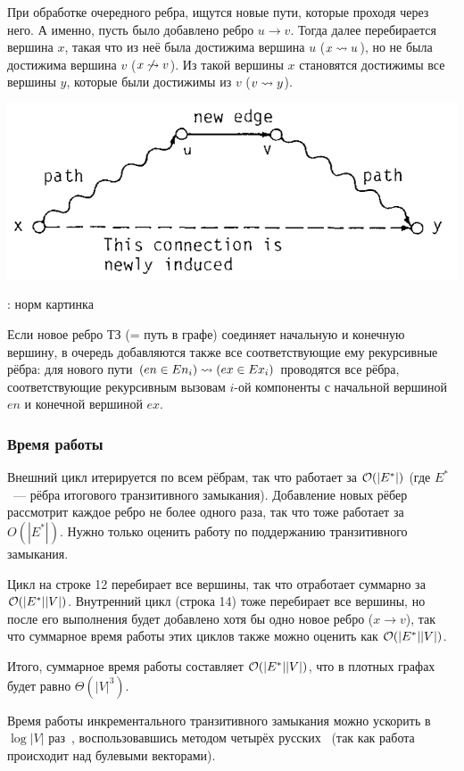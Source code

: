 При обработке очередного ребра, ищутся новые пути, которые проходя через него. А именно, пусть было добавлено ребро $u \to v$. Тогда далее перебирается вершина $x$, такая что из неё была достижима вершина $u$ ($x \rightsquigarrow u$), но не была достижима вершина $v$ ($x \not\rightsquigarrow v$). Из такой вершины $x$ становятся достижимы все вершины $y$, которые были достижимы из $v$ ($v \rightsquigarrow y$).

\includegraphics[width=0.75\linewidth]{img/TC_add}

\TODO: норм картинка

Если новое ребро ТЗ (= путь в графе) соединяет начальную и конечную вершину, в очередь добавляются также все соответствующие ему рекурсивные рёбра: для нового пути $(en \in En_i) \rightsquigarrow (ex \in Ex_i)$ проводятся все рёбра, соответствующие рекурсивным вызовам $i$-ой компоненты с начальной вершиной $en$ и конечной вершиной $ex$.

\subsubsection*{Время работы}

Внешний цикл итерируется по всем рёбрам, так что работает за $\mathcal{O}(|E^{*}|)$ (где $E^{*}$~--- рёбра итогового транзитивного замыкания). Добавление новых рёбер рассмотрит каждое ребро не более одного раза, так что тоже работает за $O(|E^{*}|)$. Нужно только оценить работу по поддержанию транзитивного замыкания. 

Цикл на строке 12 перебирает все вершины, так что отработает суммарно за $\mathcal{O}(|E^{*}| |V|)$. Внутренний цикл (строка 14) тоже перебирает все вершины, но после его выполнения будет добавлено хотя бы одно новое ребро ($x \to v$), так что суммарное время работы этих циклов также можно оценить как $\mathcal{O}(|E^{*}| |V|)$.

Итого, суммарное время работы составляет $\mathcal{O}(|E^{*}||V|)$, что в плотных графах будет равно $\Theta(|V|^3)$. 

\begin{note}
  Время работы инкрементального транзитивного замыкания можно ускорить в $\log |V|$ раз~\cite{Shemetova21}, воспользовавшись методом четырёх русских~\cite{Arlazarov70} (так как работа происходит над булевыми векторами).
\end{note}

